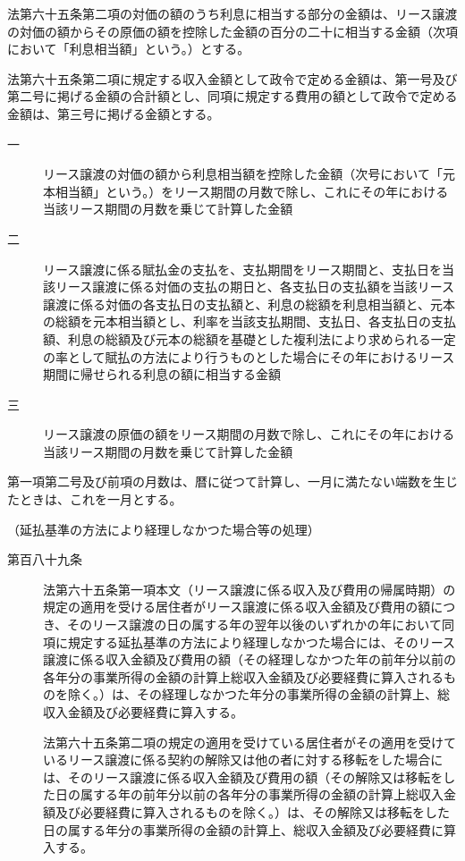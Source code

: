 \documentclass[twocolumn,a4j,10pt]{ltjtarticle}
\begin{document}
\begin{description}
\begin{description}
\begin{description}
\end{description}
\end{description}
\item[\rensuji{2}]法第六十五条第二項の対価の額のうち利息に相当する部分の金額は、リース譲渡の対価の額からその原価の額を控除した金額の百分の二十に相当する金額（次項において「利息相当額」という。）とする。
\item[\rensuji{3}]法第六十五条第二項に規定する収入金額として政令で定める金額は、第一号及び第二号に掲げる金額の合計額とし、同項に規定する費用の額として政令で定める金額は、第三号に掲げる金額とする。
\begin{description}
\item[一]リース譲渡の対価の額から利息相当額を控除した金額（次号において「元本相当額」という。）をリース期間の月数で除し、これにその年における当該リース期間の月数を乗じて計算した金額
\item[二]リース譲渡に係る賦払金の支払を、支払期間をリース期間と、支払日を当該リース譲渡に係る対価の支払の期日と、各支払日の支払額を当該リース譲渡に係る対価の各支払日の支払額と、利息の総額を利息相当額と、元本の総額を元本相当額とし、利率を当該支払期間、支払日、各支払日の支払額、利息の総額及び元本の総額を基礎とした複利法により求められる一定の率として賦払の方法により行うものとした場合にその年におけるリース期間に帰せられる利息の額に相当する金額
\item[三]リース譲渡の原価の額をリース期間の月数で除し、これにその年における当該リース期間の月数を乗じて計算した金額
\end{description}
\item[\rensuji{4}]第一項第二号及び前項の月数は、暦に従つて計算し、一月に満たない端数を生じたときは、これを一月とする。
\end{description}
\noindent\hspace{10pt}（延払基準の方法により経理しなかつた場合等の処理）
\begin{description}
\item[第百八十九条]法第六十五条第一項本文（リース譲渡に係る収入及び費用の帰属時期）の規定の適用を受ける居住者がリース譲渡に係る収入金額及び費用の額につき、そのリース譲渡の日の属する年の翌年以後のいずれかの年において同項に規定する延払基準の方法により経理しなかつた場合には、そのリース譲渡に係る収入金額及び費用の額（その経理しなかつた年の前年分以前の各年分の事業所得の金額の計算上総収入金額及び必要経費に算入されるものを除く。）は、その経理しなかつた年分の事業所得の金額の計算上、総収入金額及び必要経費に算入する。
\item[]法第六十五条第二項の規定の適用を受けている居住者がその適用を受けているリース譲渡に係る契約の解除又は他の者に対する移転をした場合には、そのリース譲渡に係る収入金額及び費用の額（その解除又は移転をした日の属する年の前年分以前の各年分の事業所得の金額の計算上総収入金額及び必要経費に算入されるものを除く。）は、その解除又は移転をした日の属する年分の事業所得の金額の計算上、総収入金額及び必要経費に算入する。
\end{description}
\end{document}
